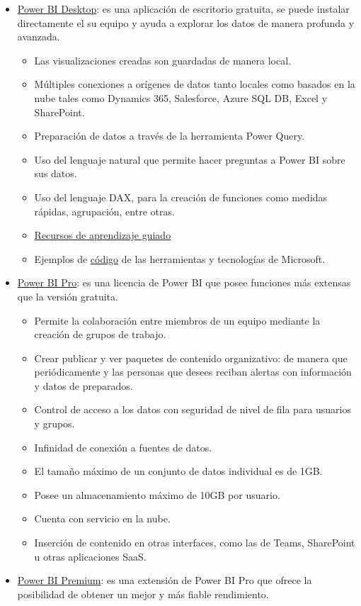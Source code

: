 \documentclass[
]{book}
\providecommand{\tightlist}{%
  \setlength{\itemsep}{0pt}\setlength{\parskip}{0pt}}
\begin{document}
\begin{itemize}
\tightlist
\item
  \href{https://powerbi.microsoft.com/es-es/desktop/}{Power BI Desktop}: es una aplicación de escritorio gratuita, se puede instalar directamente el su equipo y ayuda a explorar los datos de manera profunda y avanzada.

  \begin{itemize}
  \tightlist
  \item
    Las visualizaciones creadas son guardadas de manera local.
  \item
    Múltiples conexiones a orígenes de datos tanto locales como basados en la nube tales como Dynamics 365, Salesforce, Azure SQL DB, Excel y SharePoint.
  \item
    Preparación de datos a través de la herramienta Power Query.
  \item
    Uso del lenguaje natural que permite hacer preguntas a Power BI sobre sus datos.
  \item
    Uso del lenguaje DAX, para la creación de funciones como medidas rápidas, agrupación, entre otras.
  \item
    \href{https://docs.microsoft.com/en-us/learn/}{Recursos de aprendizaje guiado}
  \item
    Ejemplos de \href{https://docs.microsoft.com/en-us/samples/browse/}{código} de las herramientas y tecnologías de Microsoft.
  \end{itemize}
\item
  \href{https://powerbi.microsoft.com/es-es/power-bi-pro/}{Power BI Pro}: es una licencia de Power BI que posee funciones más extensas que la versión gratuita.

  \begin{itemize}
  \tightlist
  \item
    Permite la colaboración entre miembros de un equipo mediante la creación de grupos de trabajo.
  \item
    Crear publicar y ver paquetes de contenido organizativo: de manera que periódicamente y las personas que desees reciban alertas con información y datos de preparados.
  \item
    Control de acceso a los datos con seguridad de nivel de fila para usuarios y grupos.
  \item
    Infinidad de conexión a fuentes de datos.
  \item
    El tamaño máximo de un conjunto de datos individual es de 1GB.
  \item
    Posee un almacenamiento máximo de 10GB por usuario.
  \item
    Cuenta con servicio en la nube.
  \item
    Inserción de contenido en otras interfaces, como las de Teams, SharePoint u otras aplicaciones SaaS.
  \end{itemize}
\item
  \href{https://powerbi.microsoft.com/es-es/power-bi-premium/}{Power BI Premium}: es una extensión de Power BI Pro que ofrece la posibilidad de obtener un mejor y más fiable rendimiento.


\end{itemize}
\end{document}

